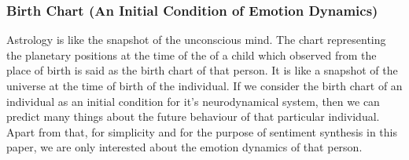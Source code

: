\subsubsection{Birth Chart (An Initial Condition of Emotion Dynamics)}
Astrology is like the snapshot of the unconscious mind. The chart representing the planetary positions at the
time of the of a child which observed from the place
of birth is said as the birth chart of that person. It is like a snapshot of the universe at the time of birth of the individual. If we consider the birth chart of an individual as an initial condition for it’s neurodynamical system, then we can predict many things about the future behaviour of that particular individual. Apart from that, for simplicity and for the purpose of sentiment synthesis in this paper, we are only interested about the emotion dynamics of that person.
